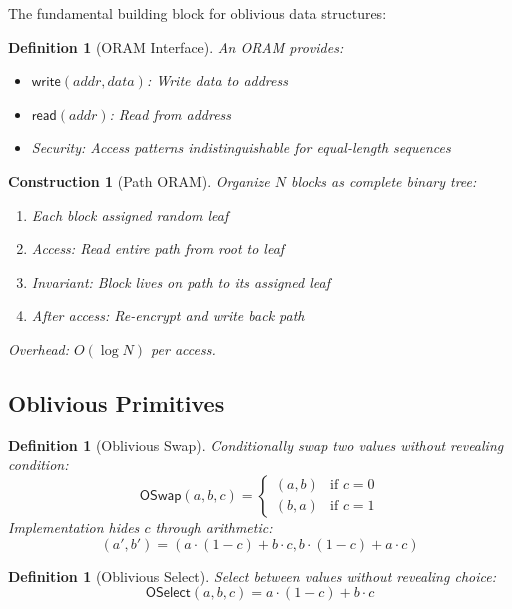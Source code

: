 \documentclass[11pt,final,hidelinks]{article}
\newcommand{\Read}{\mathsf{read}}
\newcommand{\Write}{\mathsf{write}}
\newtheorem{definition}[theorem]{Definition}
\newtheorem{construction}[theorem]{Construction}
\begin{document}
The fundamental building block for oblivious data structures:

\begin{definition}[ORAM Interface]
An ORAM provides:
\begin{itemize}
    \item $\Write(addr, data)$: Write data to address
    \item $\Read(addr)$: Read from address
    \item Security: Access patterns indistinguishable for equal-length sequences
\end{itemize}
\end{definition}

\begin{construction}[Path ORAM]
Organize $N$ blocks as complete binary tree:
\begin{enumerate}
    \item Each block assigned random leaf
    \item Access: Read entire path from root to leaf
    \item Invariant: Block lives on path to its assigned leaf
    \item After access: Re-encrypt and write back path
\end{enumerate}
Overhead: $O(\log N)$ per access.
\end{construction}

\subsection{Oblivious Primitives}

\begin{definition}[Oblivious Swap]
Conditionally swap two values without revealing condition:
\begin{equation}
\mathsf{OSwap}(a, b, c) = \begin{cases}
(a, b) & \text{if } c = 0\\
(b, a) & \text{if } c = 1
\end{cases}
\end{equation}
Implementation hides $c$ through arithmetic:
\begin{equation}
(a', b') = (a \cdot (1-c) + b \cdot c, b \cdot (1-c) + a \cdot c)
\end{equation}
\end{definition}

\begin{definition}[Oblivious Select]
Select between values without revealing choice:
\begin{equation}
\mathsf{OSelect}(a, b, c) = a \cdot (1-c) + b \cdot c
\end{equation}
\end{definition}
\end{document}
